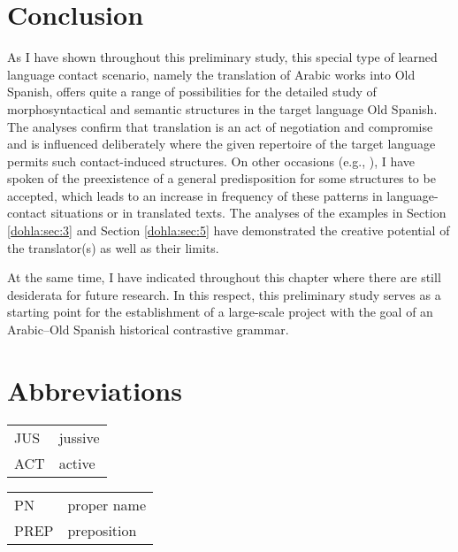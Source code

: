 \documentclass[output=paper]{langscibook}
\begin{document}
\section{Conclusion}\label{dohla:sec:6}
As I have shown throughout this preliminary study, this special type of learned language contact scenario, namely the translation of Arabic works into Old Spanish, offers quite a range of possibilities for the detailed study of morphosyntactical and semantic structures in the target language Old Spanish. The analyses confirm that translation is an act of negotiation \citep{eco_mouse_2004} and compromise \citep[169]{hasler_ubersetzung_2001} and is influenced deliberately where the given repertoire of the target language permits such contact-induced structures. On other occasions (e.g., \citealt{dohla_contact-induced_2022}), I have spoken of the preexistence of a general predisposition for some structures to be accepted, which leads to an increase in frequency of these patterns in language-contact situations or in translated texts. The analyses of the examples in Section \ref{dohla:sec:3} and Section \ref{dohla:sec:5} have demonstrated the creative potential of the translator(s) as well as their limits. 

At the same time, I have indicated throughout this chapter where there are still desiderata for future research. In this respect, this preliminary study serves as a starting point for the establishment of a large-scale project with the goal of an Arabic–Old Spanish historical contrastive grammar.


\section*{Abbreviations}
\begin{tabularx}{.45\textwidth}{lQ}
JUS & jussive		\\
ACT & active		\\
\end{tabularx}
\begin{tabularx}{.45\textwidth}{lQ}
PN & proper name		\\
PREP & preposition
\end{tabularx}

\printbibliography[heading=subbibliography, notkeyword=this]
\end{document}
